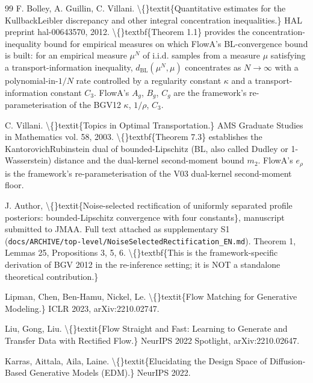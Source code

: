 \documentclass[preprint,3p,times,twocolumn]{elsarticle}
\begin{document}
\begin{thebibliography}{99}
 F. Bolley, A. Guillin, C. Villani. \textbackslash\{\}textit\{Quantitative estimates for the KullbackLeibler discrepancy and other integral concentration inequalities.\} HAL preprint hal-00643570, 2012. \textbackslash\{\}textbf\{Theorem 1.1\} provides the concentration-inequality bound for empirical measures on which FlowA's BL-convergence bound is built: for an empirical measure $\mu^N$ of i.i.d. samples from a measure $\mu$ satisfying a transport-information inequality, $d_{\mathrm{BL}}(\mu^N, \mu)$ concentrates as $N \to \infty$ with a polynomial-in-$1/N$ rate controlled by a regularity constant $\kappa$ and a transport-information constant $C_3$. FlowA's $A_g$, $B_g$, $C_g$ are the framework's re-parameterisation of the BGV12 $\kappa$, $1/\rho$, $C_3$.

 C. Villani. \textbackslash\{\}textit\{Topics in Optimal Transportation.\} AMS Graduate Studies in Mathematics vol. 58, 2003. \textbackslash\{\}textbf\{Theorem 7.3\} establishes the KantorovichRubinstein dual of bounded-Lipschitz (BL, also called Dudley or 1-Wasserstein) distance and the dual-kernel second-moment bound $m_2$. FlowA's $e_\rho$ is the framework's re-parameterisation of the V03 dual-kernel second-moment floor.

 J. Author, \textbackslash\{\}textit\{Noise-selected rectification of uniformly separated profile posteriors: bounded-Lipschitz convergence with four constants\}, manuscript submitted to JMAA. Full text attached as supplementary S1 (\texttt{docs/ARCHIVE/top-level/NoiseSelectedRectification\_EN.md}). Theorem 1, Lemmas 25, Propositions 3, 5, 6. \textbackslash\{\}textbf\{This is the framework-specific derivation of BGV 2012 in the re-inference setting; it is NOT a standalone theoretical contribution.\}

 Lipman, Chen, Ben-Hamu, Nickel, Le. \textbackslash\{\}textit\{Flow Matching for Generative Modeling.\} ICLR 2023, arXiv:2210.02747.

 Liu, Gong, Liu. \textbackslash\{\}textit\{Flow Straight and Fast: Learning to Generate and Transfer Data with Rectified Flow.\} NeurIPS 2022 Spotlight, arXiv:2210.02647.

 Karras, Aittala, Aila, Laine. \textbackslash\{\}textit\{Elucidating the Design Space of Diffusion-Based Generative Models (EDM).\} NeurIPS 2022.


\end{thebibliography}
\end{document}
